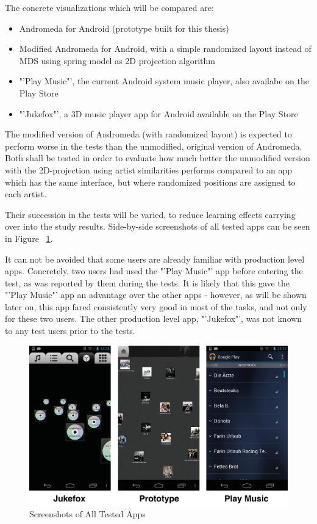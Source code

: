 The concrete visualizations which will be compared are:

\begin{itemize}
	\item Andromeda for Android (prototype built for this thesis)
	\item Modified Andromeda for Android, with a simple randomized layout instead of MDS using spring model as 2D projection algorithm
	\item "'Play Music"', the current Android system music player, also availabe on the Play Store \cite{url:playmusic}
	\item "'Jukefox"', a 3D music player app for Android available on the Play Store \cite{url:jukefox}
\end{itemize}

The modified version of Andromeda (with randomized layout) is expected to perform worse in the tests than the unmodified, original version of Andromeda. Both shall be tested in order to evaluate how much better the unmodified version with the 2D-projection using artist similarities performs compared to an app which has the same interface, but where randomized positions are assigned to each artist.

Their succession in the tests will be varied, to reduce learning effects carrying over into the study results. Side-by-side screenshots of all tested apps can be seen in Figure ~\ref{fig:apps_screenshots}.

It can not be avoided that some users are already familiar with production level apps. Concretely, two users had used the "'Play Music"' app before entering the test, as was reported by them during the tests. It is likely that this gave the "'Play Music"' app an advantage over the other apps - however, as will be shown later on, this app fared consistently very good in most of the tasks, and not only for these two users. The other production level app, "'Jukefox"', was not known to any test users prior to the tests.

\begin{figure}[H]
  \centering
    \includegraphics[width=1\textwidth]{figures/apps_screenshots}
  \caption{Screenshots of All Tested Apps}
  \label{fig:apps_screenshots}
\end{figure}

